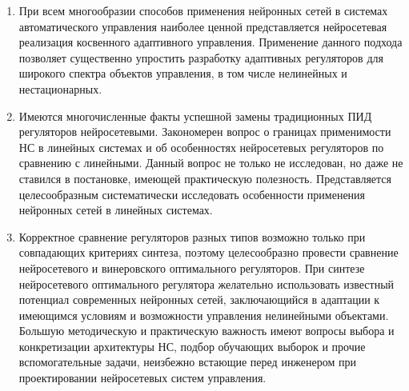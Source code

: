 \begin{enumerate}

\item
При всем многообразии способов применения нейронных сетей в системах
автоматического управления наиболее ценной представляется нейросетевая
реализация косвенного адаптивного управления.  Применение данного
подхода позволяет существенно упростить разработку адаптивных
регуляторов для широкого спектра объектов управления, в том числе
нелинейных и нестационарных.


\item
Имеются многочисленные факты успешной замены традиционных ПИД
регуляторов нейросетевыми.  Закономерен вопрос о границах применимости
НС в линейных системах и об особенностях нейросетевых регуляторов по
сравнению с линейными.  Данный вопрос не только не исследован, но даже
не ставился в постановке, имеющей практическую полезность.
Представляется целесообразным систематически исследовать особенности
применения нейронных сетей в линейных системах.


\item
Корректное сравнение регуляторов разных типов возможно только при
совпадающих критериях синтеза, поэтому целесообразно провести
сравнение нейросетевого и винеровского оптимального регуляторов.  При
синтезе нейросетевого оптимального регулятора желательно использовать
известный потенциал современных нейронных сетей, заключающийся в
адаптации к имеющимся условиям и возможности управления нелинейными
объектами.  Большую методическую и практическую важность имеют вопросы
выбора и конкретизации архитектуры НС, подбор обучающих выборок и
прочие вспомогательные задачи, неизбежно встающие перед инженером при
проектировании нейросетевых систем управления.


\end{enumerate}
